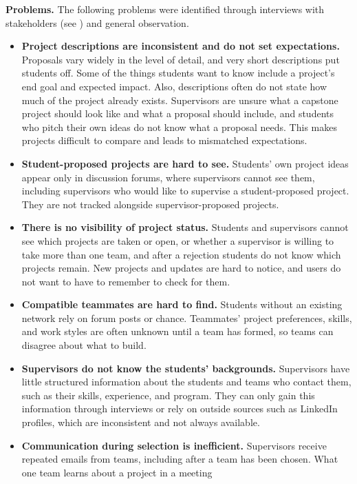 \documentclass[12pt]{article}
\newcounter{tin}
\begin{document}
  \textbf{Problems.} The following problems were identified through interviews with stakeholders (see
  ) and general observation.
  \begin{itemize}
    \item \textbf{Project descriptions are inconsistent and do not set expectations.} Proposals vary
    widely in the level of detail, and very short descriptions put students off. Some of the things
    students want to know include a project's end goal and expected impact. Also, descriptions often do not
    state how much of the project already exists. Supervisors are unsure what a capstone project
    should look like and what a proposal should include, and students who pitch their
    own ideas do not know what a proposal needs. This makes projects difficult to compare and leads
    to mismatched expectations.
    \item \textbf{Student-proposed projects are hard to see.} Students' own project ideas appear only in
    discussion forums, where supervisors cannot see them, including supervisors who would like to
    supervise a student-proposed project. They are not tracked alongside supervisor-proposed projects.
    \item \textbf{There is no visibility of project status.} Students and supervisors cannot see which
    projects are taken or open, or whether a supervisor is willing to take more than one team, and after a
    rejection students do not know which projects remain. New projects and updates are hard to notice, and
    users do not want to have to remember to check for them.
    \item \textbf{Compatible teammates are hard to find.} Students without an existing network rely on
    forum posts or chance. Teammates' project preferences, skills, and work styles are often unknown until
    a team has formed, so teams can disagree about what to build.
    \item \textbf{Supervisors do not know the students' backgrounds.} Supervisors have little structured
    information about the students and teams who contact them, such as their skills, experience, and
    program. They can only gain this information through interviews or rely on outside sources such as
    LinkedIn profiles, which are inconsistent and not always available.
    \item \textbf{Communication during selection is inefficient.} Supervisors receive repeated emails
    from teams, including after a team has been chosen. What one team learns about a project in a meeting

\end{itemize}
\end{document}
